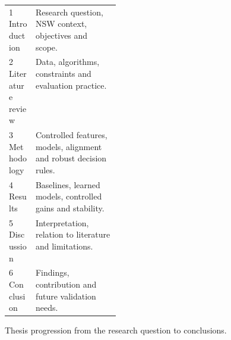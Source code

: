 \begin{figure}[!htbp]\centering\small
\begin{tabularx}{\linewidth}{|p{0.24\linewidth}|X|}\hline
1 Introduction & Research question, NSW context, objectives and scope. \\
2 Literature review & Data, algorithms, constraints and evaluation practice. \\
3 Methodology & Controlled features, models, alignment and robust decision rules. \\
4 Results & Baselines, learned models, controlled gains and stability. \\
5 Discussion & Interpretation, relation to literature and limitations. \\
6 Conclusion & Findings, contribution and future validation needs. \\
\hline\end{tabularx}
\caption{Thesis progression from the research question to conclusions.}\label{fig:ch1_1}\end{figure}
